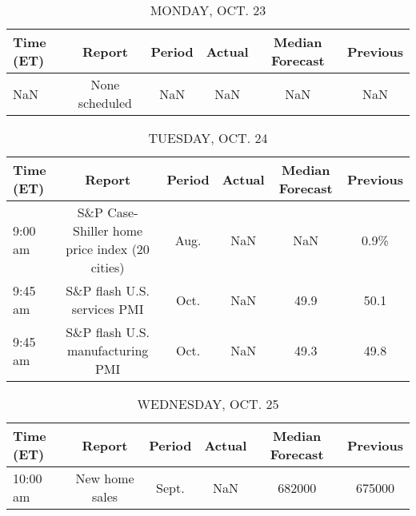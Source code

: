 \documentclass{article}%
\begin{document}
%
\normalsize%


\begin{table}[htbp]%
\caption{MONDAY, OCT. 23}%
\centering%
\begin{adjustbox}{width=1\textwidth}%
\begin{tabular}{lccccc}
\toprule
Time (ET) &         Report & Period & Actual & Median Forecast & Previous \\
\midrule
      NaN & None scheduled &    NaN &    NaN &             NaN &      NaN \\
\bottomrule
\end{tabular}
%
\end{adjustbox}%
\end{table}

%


\begin{table}[htbp]%
\caption{TUESDAY, OCT. 24}%
\centering%
\begin{adjustbox}{width=1\textwidth}%
\begin{tabular}{lccccc}
\toprule
Time (ET) &                                        Report & Period & Actual & Median Forecast & Previous \\
\midrule
  9:00 am & S\&P Case-Shiller home price index (20 cities) &   Aug. &    NaN &             NaN &     0.9\% \\
  9:45 am &                   S\&P flash U.S. services PMI &   Oct. &    NaN &            49.9 &     50.1 \\
  9:45 am &              S\&P flash U.S. manufacturing PMI &   Oct. &    NaN &            49.3 &     49.8 \\
\bottomrule
\end{tabular}
%
\end{adjustbox}%
\end{table}

%


\begin{table}[htbp]%
\caption{WEDNESDAY, OCT. 25}%
\centering%
\begin{adjustbox}{width=1\textwidth}%
\begin{tabular}{lccccc}
\toprule
Time (ET) &         Report & Period & Actual & Median Forecast & Previous \\
\midrule
 10:00 am & New home sales &  Sept. &    NaN &          682000 &   675000 \\
\bottomrule
\end{tabular}
%
\end{adjustbox}%
\end{table}
\end{document}
